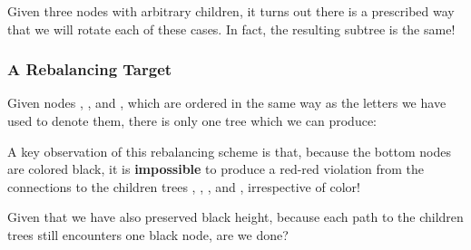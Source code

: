 \documentclass[aspectratio=169]{beamer}
\begin{document}
\begin{frame}
  \pause
  \vspace{\fill}

  Given three nodes with arbitrary children, it turns out there is a
  prescribed way that we will rotate each of these cases. In fact,
  the resulting subtree is the same!
\end{frame}

\begin{frame}
  \frametitle{A Rebalancing Target}

  \begin{center}
    \begin{minipage}{0.58\textwidth}
      \raggedright

      Given nodes , , and , which are ordered in the
      same way as the letters we have used to denote them, there is only one
      tree which we can produce:

      \pause
      \vspace{10pt}

      A key observation of this rebalancing scheme is that, because the
      bottom nodes are colored black, it is \textbf{impossible} to produce a red-red
      violation from the connections to the children trees , ,
      , and , irrespective of color!

      \vspace{10pt}

      Given that we have also preserved black height, because each path to
      the children trees still encounters one black node, are we done?
    \end{minipage}
    \hfill
    \begin{minipage}{0.4\textwidth}
      \centering
    \end{minipage}
  \end{center}
\end{frame}
\end{document}
